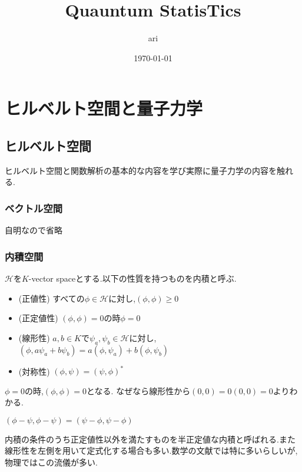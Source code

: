 \documentclass[uplatex]{jsbook}
\title{Quauntum StatisTics}
\author{ari}
\date{\today}
\begin{document}
\maketitle
\tableofcontents
\part{ヒルベルト空間と量子力学}
\chapter{ヒルベルト空間}
ヒルベルト空間と関数解析の基本的な内容を学び実際に量子力学の内容を触れる.
\section{ベクトル空間}
自明なので省略

\section{内積空間}

\begin{screen}
\begin{dfn}
 $\mathcal{H}$を$K$-vector spaceとする.以下の性質を持つものを内積と呼ぶ.
 \begin{itemize}
   \item (正値性) すべての$\phi \in \mathcal{H}$に対し,$(\phi, \phi) \ge 0$
   \item (正定値性) $(\phi, \phi) = 0$の時$\phi = 0$
   \item (線形性) $a,b \in K$で$\psi_a, \psi_b \in \mathcal{H}$に対し,$(\phi, a \psi_a + b\psi_b) = a(\phi, \psi_a) + b(\phi, \psi_b)$
   \item (対称性) $(\phi, \psi) = (\psi, \phi)^*$
 \end{itemize}
\end{dfn}
\end{screen}

\begin{rem}
  $\phi = 0$の時,$(\phi, \phi) = 0$となる. なぜなら線形性から$(0, 0) = 0(0, 0) = 0$よりわかる.
\end{rem}

\begin{rem}
  $(\phi - \psi, \phi - \psi) = (\psi - \phi, \psi - \phi)$
\end{rem}

\begin{rem}
  内積の条件のうち正定値性以外を満たすものを半正定値な内積と呼ばれる.また線形性を左側を用いて定式化する場合も多い.数学の文献では特に多いらしいが,物理ではこの流儀が多い.
\end{rem}
\end{document}
